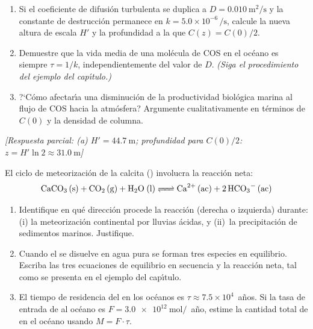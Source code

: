 \begin{bloque_ejercicios}
\begin{ejercicios}
\begin{enumerate}[label=\alph*)]
    \item Si el coeficiente de difusi\'on turbulenta se duplica a
          $D = \SI{0.010}{\metre\squared\per\second}$ y la constante de
          destrucci\'on permanece en $k = 5.0\times10^{-6}\,\si{\per\second}$,
          calcule la nueva altura de escala $H'$ y la profundidad a la que
          $C(z) = C(0)/2$.

    \item Demuestre que la vida media de una mol\'ecula de COS en el oc\'eano
          es siempre $\tau = 1/k$, independientemente del valor de $D$.
          \textit{(Siga el procedimiento del ejemplo del cap\'{\i}tulo.)}

    \item ?`C\'omo afectar\'{\i}a una disminuci\'on de la productividad biol\'ogica
          marina al flujo de COS hacia la atm\'osfera? Argumente
          cualitativamente en t\'erminos de $C(0)$ y la densidad de columna.
\end{enumerate}

\textit{[Respuesta parcial: (a) $H' = \SI{44.7}{\metre}$;
profundidad para $C(0)/2$: $z = H'\ln 2 \approx \SI{31.0}{\metre}$]}

\item El ciclo de meteorizaci\'on de la calcita () involucra la
reacci\'on neta:
\[
    \ce{CaCO3 (s) + CO2 (g) + H2O (l) <=> Ca^{2+} (ac) + 2HCO3^- (ac)}
\]

\begin{enumerate}[label=\alph*)]
    \item Identifique en qu\'e direcci\'on procede la reacci\'on
          (derecha o izquierda) durante: (i) la meteorizaci\'on continental
          por lluvias \'acidas, y (ii)~la precipitaci\'on de sedimentos
          marinos. Justifique.

    \item Cuando el  se disuelve en agua pura se forman tres
          especies en equilibrio. Escriba las tres ecuaciones de equilibrio
          en secuencia y la reacci\'on neta, tal como se presenta en el
          ejemplo del cap\'{\i}tulo.

    \item El tiempo de residencia del  en los oc\'eanos es
          $\tau \approx 7.5\times10^4$~a\~nos. Si la tasa de entrada de
           al oc\'eano es $F = \SI{3.0e12}{\mole}/$~a\~no,
          estime la cantidad total de  en el oc\'eano usando
          $M = F \cdot \tau$.


\end{enumerate}
\end{ejercicios}
\end{bloque_ejercicios}
